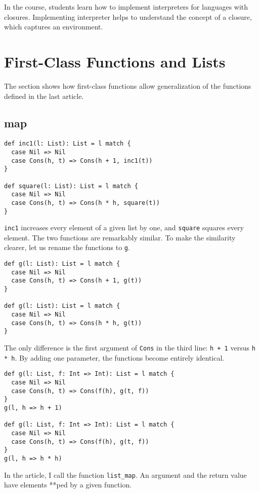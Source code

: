 In the course, students learn how to implement interpreters for languages with
closures. Implementing interpreter helps to understand the concept of a closure,
which captures an environment.

\section{First-Class Functions and Lists}

The section shows how first-class functions allow generalization of the functions
defined in the last article.

\subsection{map}

\begin{verbatim}
def inc1(l: List): List = l match {
  case Nil => Nil
  case Cons(h, t) => Cons(h + 1, inc1(t))
}

def square(l: List): List = l match {
  case Nil => Nil
  case Cons(h, t) => Cons(h * h, square(t))
}
\end{verbatim}

\verb!inc1! increases every element of a given list by one, and \verb!square!
squares every element. The two functions are remarkably similar. To make the
similarity clearer, let us rename the functions to \verb!g!.

\begin{verbatim}
def g(l: List): List = l match {
  case Nil => Nil
  case Cons(h, t) => Cons(h + 1, g(t))
}

def g(l: List): List = l match {
  case Nil => Nil
  case Cons(h, t) => Cons(h * h, g(t))
}
\end{verbatim}

The only difference is the first argument of \verb!Cons! in the third line:
\verb!h + 1! versus \verb!h * h!. By adding one parameter, the functions become
entirely identical.

\begin{verbatim}
def g(l: List, f: Int => Int): List = l match {
  case Nil => Nil
  case Cons(h, t) => Cons(f(h), g(t, f))
}
g(l, h => h + 1)

def g(l: List, f: Int => Int): List = l match {
  case Nil => Nil
  case Cons(h, t) => Cons(f(h), g(t, f))
}
g(l, h => h * h)
\end{verbatim}

In the article, I call the function \verb!list_map!. An argument and the return
value have elements **ped by a given function.

